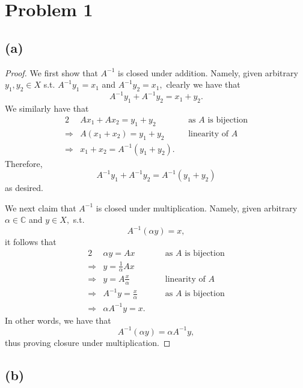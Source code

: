 \documentclass[10pt]{article}
\begin{document}
\section*{Problem 1}

\subsection*{(a)}

\begin{proof}
    We first show that $A^{-1}$ is closed under addition. Namely, given arbitrary $y_1, y_2 \in X$ s.t. $A^{-1}y_1 = x_1$ and $A^{-1}y_2 = x_1,$ clearly we have that
    \[A^{-1}y_1 + A^{-1}y_2 = x_1 + y_2.\]
    We similarly have that
    \begin{alignat*}{2}
        &Ax_1 + Ax_2 = y_1 + y_2 \qquad&&\text{as $A$ is bijection}\\ 
        \Rightarrow& A(x_1 + x_2) = y_1 + y_2 &&\text{linearity of $A$}\\
        \Rightarrow& x_1 + x_2 = A^{-1}(y_1 + y_2).
    \end{alignat*}
    Therefore,
    \[A^{-1}y_1 + A^{-1}y_2 = A^{-1}(y_1+y_2)\]
    as desired.

    We next claim that $A^{-1}$ is closed under multiplication. Namely, given arbitrary $\alpha\in\mathbb{C}$ and $y\in X,$ s.t.
    \[A^{-1}(\alpha y)=x,\]
    it follows that
    \begin{alignat*}{2}
        &\alpha y = Ax\qquad&&\text{as $A$ is bijection}\\
        \Rightarrow& y = \frac{1}{\alpha}Ax\\
        \Rightarrow& y = A \frac{x}{\alpha} &&\text{linearity of $A$}\\
        \Rightarrow& A^{-1}y = \frac{x}{\alpha} &&\text{as $A$ is bijection}\\
        \Rightarrow& \alpha A^{-1}y = x.
    \end{alignat*}
    In other words, we have that
    \[A^{-1}(\alpha y) = \alpha A^{-1}y,\]
    thus proving closure under multiplication.
\end{proof}


\subsection*{(b)}
\end{document}
